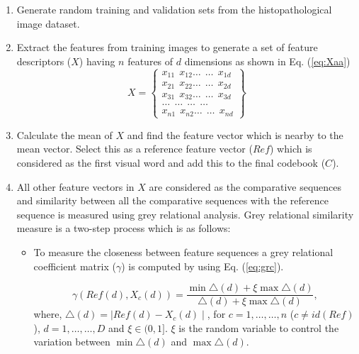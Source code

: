 \begin{enumerate}

\item Generate random training and validation sets from the histopathological image dataset.

\item Extract the features from training images to generate a set of feature descriptors ($X$) having $n$ features of $d$ dimensions as shown in Eq. (\ref{eq:Xaa})  
\begin{equation}\label{eq:Xaa}
X=\left\{\begin{array}{c}
x_{11} \  \ x_{12} \dots \ \    \dots \ \ x_{1d}\\ 
x_{21} \ \ x_{22}\dots  \ \     \dots \ \ x_{2d}\\
x_{31}  \ \ x_{32} \dots \ \    \dots \ \ x_{3d}\\
\dots \ \ \dots \ \    \dots \ \ \dots  \\
x_{n1} \ \ x_{n2} \dots \ \      \dots \ \ x_{nd}
\end{array}\right\}
\end{equation}

\item Calculate the mean of $X$ and find the feature vector which is nearby to the mean vector. Select this as a reference feature vector ($Ref$) which is considered as the first visual word and add this to the final codebook ($C$).

\item  All other feature vectors in $X$ are considered as the comparative sequences and similarity between all the comparative sequences with the reference sequence is measured using grey relational analysis. Grey relational similarity measure is a two-step process which is as follows:
\begin{itemize}
\item To measure the closeness between feature sequences a grey relational coefficient matrix ($\gamma$) is computed by using Eq. (\ref{eq:grc}).

\begin{equation} \label{eq:grc}
\gamma(Ref(d), X_{c}(d))=\frac{ \min \triangle(d) + \xi \max \triangle(d) }{\triangle(d)+\xi \max \triangle(d)}, 
\end{equation}
where, $ \triangle(d)= \mid Ref(d) - X_{c}(d) \mid$, for $c=1, \dots, \dots, n$ ($c\neq id(Ref)$), $d= 1, \dots , \dots, D$ and $\xi \in (0,1]$. $\xi$ is the random variable to control the variation between $ \min \triangle(d)$ and $\max\triangle(d)$. 


\end{itemize}
\end{enumerate}
